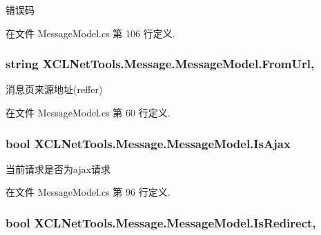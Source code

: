 错误码 



在文件 Message\-Model.\-cs 第 106 行定义.

\hypertarget{class_x_c_l_net_tools_1_1_message_1_1_message_model_afa48da00ef35d78d182c025a1f0dcbc0}{
\subsubsection[{From\-Url}]{\setlength{\rightskip}{0pt plus 5cm}string X\-C\-L\-Net\-Tools.\-Message.\-Message\-Model.\-From\-Url\hspace{0.3cm}{\ttfamily [get]}, {\ttfamily [set]}}}\label{class_x_c_l_net_tools_1_1_message_1_1_message_model_afa48da00ef35d78d182c025a1f0dcbc0}


消息页来源地址(reffer) 



在文件 Message\-Model.\-cs 第 60 行定义.

\hypertarget{class_x_c_l_net_tools_1_1_message_1_1_message_model_ad0286a8e34c0cd7495034ac04c4d0ada}{
\subsubsection[{Is\-Ajax}]{\setlength{\rightskip}{0pt plus 5cm}bool X\-C\-L\-Net\-Tools.\-Message.\-Message\-Model.\-Is\-Ajax\hspace{0.3cm}{\ttfamily [get]}}}\label{class_x_c_l_net_tools_1_1_message_1_1_message_model_ad0286a8e34c0cd7495034ac04c4d0ada}


当前请求是否为ajax请求 



在文件 Message\-Model.\-cs 第 96 行定义.

\hypertarget{class_x_c_l_net_tools_1_1_message_1_1_message_model_a167c5dfe1818b0685dc7ceca3c1ed5ba}{
\subsubsection[{Is\-Redirect}]{\setlength{\rightskip}{0pt plus 5cm}bool X\-C\-L\-Net\-Tools.\-Message.\-Message\-Model.\-Is\-Redirect\hspace{0.3cm}{\ttfamily [get]}, {\ttfamily [set]}}}\label{class_x_c_l_net_tools_1_1_message_1_1_message_model_a167c5dfe1818b0685dc7ceca3c1ed5ba}


